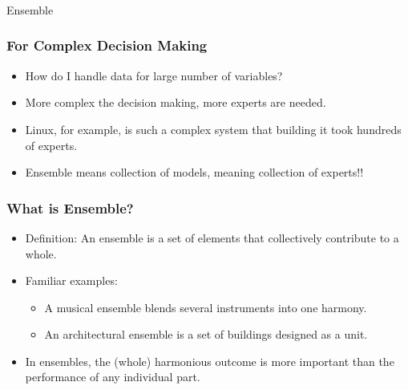 \usetikzlibrary{positioning}

\begin{frame}[fragile]\frametitle{}
\begin{center}
{\Large Ensemble}
\end{center}
\end{frame}


\begin{frame}[fragile]\frametitle{For Complex Decision Making}
\begin{itemize}
\item How do I handle data for large number of variables?
\item More complex the decision making, more experts are needed.
\item  Linux, for example, is such a complex system that building it took hundreds of experts.
\item Ensemble means collection of models, meaning collection of experts!!
\end{itemize}
\end{frame}

\begin{frame}[fragile]\frametitle{What is Ensemble?}
\begin{itemize}
\item Definition: An ensemble is a set of elements that collectively contribute to a whole.
\item Familiar examples:
\begin{itemize}
\item A musical ensemble blends several instruments into one harmony.
\item An architectural ensemble is a set of buildings designed as a unit.
\end{itemize}
\item In ensembles, the (whole) harmonious outcome is more important than the performance of any individual part.
\end{itemize}
\end{frame}

